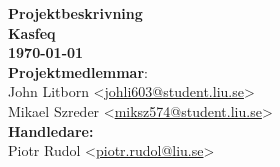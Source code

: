 \begin{titlepage}
   \begin{center}
      \textbf{\Huge Projektbeskrivning}\\[1cm]
      \textbf{\Large Kasfeq}\\[0.5cm]
      \textbf{\large \today}\\[1cm]
      
      \textbf{Projektmedlemmar}:\\
      John Litborn <\href{mailto:johli603@student.liu.se}{johli603@student.liu.se}>\\
      Mikael Szreder <\href{mailto:miksz574@student.liu.se}{miksz574@student.liu.se}>\\[0.5cm]

      \textbf{Handledare:}\\
      Piotr Rudol <\href{mailto:piotr.rudol@liu.se}{piotr.rudol@liu.se}>\\
   \end{center}
\end{titlepage}
